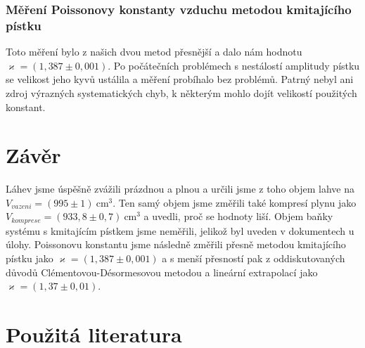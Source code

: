\documentclass[english]{article}
\newcommand{\unit}[1]{\mathrm{#1}}
\begin{document}
			\subsubsection{Měření Poissonovy konstanty vzduchu metodou kmitajícího pístku}	
					Toto měření bylo z našich dvou metod přesnější a dalo nám hodnotu $\varkappa = (1,387\pm0,001)$. Po počátečních problémech s nestálostí amplitudy pístku se velikost jeho kyvů ustálila a měření probíhalo bez problémů. Patrný nebyl ani zdroj výrazných systematických chyb, k některým mohlo dojít velikostí použitých konstant.

\section{Závěr}
		Láhev jsme úspěšně zvážili prázdnou a plnou a určili jsme z toho objem lahve na $V_{vazeni} = (995\pm1)\unit{\ cm^3}$. Ten samý objem jsme změřili také kompresí plynu jako $V_{komprese} = (933,8\pm0,7)\unit{\ cm^3}$ a uvedli, proč se hodnoty liší. Objem baňky systému s kmitajícím pístkem jsme neměřili, jelikož byl uveden v dokumentech u úlohy. Poissonovu konstantu jsme následně změřili přesně metodou kmitajícího pístku jako $\varkappa = (1,387\pm0,001)$ a s menší přesností pak z oddiskutovaných důvodů Clémentovou-Désormesovou metodou a lineární extrapolací jako $\varkappa = (1,37\pm0,01)$. 
			
\section {Použitá literatura}
\begingroup
\renewcommand{\section}[2]{}
\end{document}
